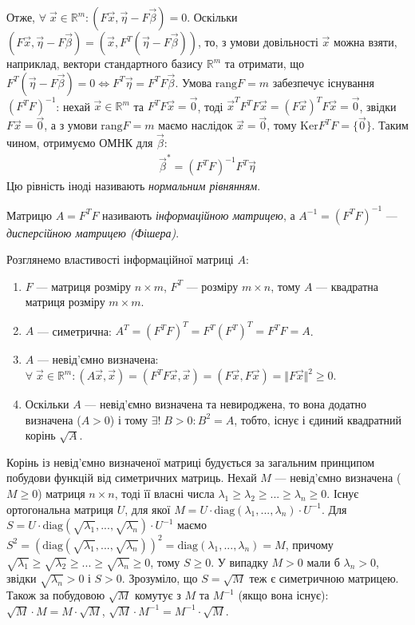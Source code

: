 Отже, $\forall\; \vec{x} \in \mathbb{R}^m: \left(F\vec{x}, \vec{\eta} - F \vec{\beta}\right) = 0$.
Оскільки $\left(F\vec{x}, \vec{\eta} - F \vec{\beta}\right) = \left(\vec{x}, F^T (\vec{\eta} - F \vec{\beta})\right)$,
то, з умови довільності $\vec{x}$ можна взяти, наприклад, вектори стандартного базису $\mathbb{R}^m$ та
отримати, що $F^T (\vec{\eta} - F \vec{\beta}) = 0 \Leftrightarrow F^T \vec{\eta} = F^T F \vec{\beta}$.
Умова $\mathrm{rang}{F} = m$ забезпечує існування $(F^T F)^{-1}$: нехай $\vec{x} \in \mathbb{R}^m$ та 
$F^T F \vec{x} = \vec{0}$, тоді $\vec{x}^T F^T F \vec{x} = (F\vec{x})^T F\vec{x} = \vec{0}$,
звідки $F\vec{x} = \vec{0}$, а з умови $\mathrm{rang}{F} = m$ маємо наслідок $\vec{x} = \vec{0}$,
тому $\mathrm{Ker} F^T F = \{ \vec{0}\}$.
Таким чином, отримуємо ОМНК для $\vec{\beta}$:
\begin{gather}\label{regr_coef}
    \vec{\beta}^* = (F^T F)^{-1} F^T \vec{\eta}
\end{gather}
Цю рівність іноді називають \emph{нормальним рівнянням}.
\begin{definition}
    Матрицю $A = F^T F$ називають \emph{інформаційною матрицею}, а $A^{-1} = 
    (F^T F)^{-1}$ --- \emph{дисперсійною матрицею (Фішера)}.
\end{definition}
Розглянемо властивості інформаційної матриці $A$:
\begin{enumerate}
    \item $F$ --- матриця розміру $n \times m$, $F^T$ --- розміру $m \times n$, тому
    $A$ --- квадратна матриця розміру $m \times m$.
    \item $A$ --- симетрична: $A^T = (F^T F)^T = F^T (F^T)^T = F^T F = A$.
    \item $A$ --- невід'ємно визначена: $\forall \; \vec{x} \in \mathbb{R}^m : \left(A\vec{x}, \vec{x}\right) = \left(F^T F \vec{x}, \vec{x}\right) = \left(F\vec{x}, F\vec{x}\right) = \Vert F \vec{x}\Vert^2 \geq 0$.
    \item Оскільки $A$ --- невід'ємно визначена та невироджена, то вона додатно визначена ($A > 0$) і тому $\exists! \; B > 0 :  B^2 = A$,
    тобто, існує і єдиний квадратний корінь $\sqrt{A}$.
\end{enumerate}
\begin{remark}
    Корінь із невід'ємно визначеної матриці будується за загальним принципом побудови функцій від симетричних матриць.
    Нехай $M$ --- невід'ємно визначена ($M \geq 0$) матриця $n \times n$, тоді її власні числа $\lambda_1 \geq \lambda_2 \geq ... \geq \lambda_n \geq 0$.
    Існує ортогональна матриця $U$, для якої $M = U \cdot \mathrm{diag}(\lambda_1, ..., \lambda_n) \cdot U^{-1}$.
    Для $S = U \cdot \mathrm{diag}(\sqrt{\lambda_1}, ..., \sqrt{\lambda_n}) \cdot U^{-1}$ маємо
    $S^2 = \left(\mathrm{diag}(\sqrt{\lambda_1}, ..., \sqrt{\lambda_n})\right)^2 = \mathrm{diag}(\lambda_1, ..., \lambda_n) = M$,
    причому $\sqrt{\lambda_1} \geq \sqrt{\lambda_2} \geq ... \geq \sqrt{\lambda_n} \geq 0$, тому $S \geq 0$. У випадку $M>0$
    мали б $\lambda_n > 0$, звідки $\sqrt{\lambda_n} > 0$ і $S > 0$. Зрозуміло, що $S = \sqrt{M}$ теж є симетричною матрицею. Також за побудовою
    $\sqrt{M}$ комутує з $M$ та $M^{-1}$ (якщо вона існує): $\sqrt{M} \cdot M = M \cdot \sqrt{M}$, $\sqrt{M} \cdot M^{-1} = M^{-1} \cdot \sqrt{M}$. 
\end{remark}
